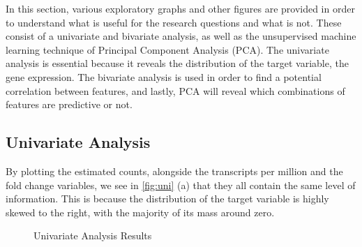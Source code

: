 \documentclass[11pt,twoside]{article}
\numberwithin{Theorem}{section}
\numberwithin{Definition}{section}
\numberwithin{Lemma}{section}
\numberwithin{Algorithm}{section}
\numberwithin{equation}{section}
\begin{document}
In this section, various exploratory graphs and other figures are provided in order to understand what is useful for the research questions and what is not. These consist of a univariate and bivariate analysis, as well as the unsupervised machine learning technique of Principal Component Analysis (PCA). The univariate analysis is essential because it reveals the distribution of the target variable, the gene expression. The bivariate analysis is used in order to find a potential correlation between features, and lastly, PCA will reveal which combinations of features are predictive or not.

\subsection{Univariate Analysis}
\label{sec:univariate}

By plotting the estimated counts, alongside the transcripts per million and the fold change variables, we see in \autoref{fig:uni} (a) that they all contain the same level of information. This is because the distribution of the target variable is highly skewed to the right, with the majority of its mass around zero. 


\begin{figure}[h]
    \centering
    \caption{Univariate Analysis Results}
    \label{fig:uni}
\end{figure}
\end{document}
